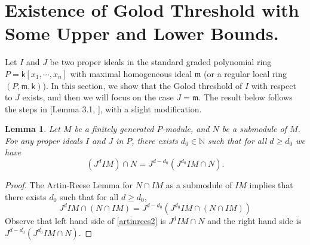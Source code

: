 \documentclass[10pt,reqno]{amsart}
\newcounter{intro}
\newtheorem{lemma}[subsection]{Lemma}
\theoremstyle{definition}
\theoremstyle{remark}
\numberwithin{equation}{section}
\newcommand{\depth}{\mathrm{depth}}
\newcommand{\kk}{\mathsf k}
\newcommand{\m}{\mathfrak m}
\numberwithin{equation}{section}
\begin{document}



\section{Existence of Golod Threshold with Some Upper and Lower Bounds.}
Let $I$ and $J$ be two proper ideals in the standard graded polynomial ring $P=\kk[x_1,\cdots,x_n]$ with maximal homogeneous ideal $\m$ (or a regular local ring $(P,\m,\kk)$). In this section, we show that the Golod threshold of $I$ with respect to $J$ exists, and then we will focus on the case $J=\m$.
 The result below follows the steps in [Lemma 3.1, \cite{maleki2019golod}], with a slight modification.
\begin{lemma}\label{artinrees1}
    Let $M$ be a finitely generated $P$-module, and $N$ be a submodule of $M$. For any proper ideals $I$ and $J$ in $P$, there exists $d_0\in \mathbb{N}$ such that for all $d\geq d_0$ we have \[
    (J^dIM)\cap N=J^{d-d_0}(J^{d_0}IM\cap N).
    \]
\end{lemma}
\begin{proof}
    The Artin-Reese Lemma for $N\cap IM$ as a submodule of $IM$ implies that there exists $d_0$ such that for all $d\geq d_0$,\begin{equation}\label{artinrees2}
    J^dIM\cap (N\cap IM)=J^{d-d_0}(J^{d_0}IM\cap (N\cap IM))
    \end{equation}
    Observe that left hand side of \cref{artinrees2} is $J^dIM\cap N$ and the right hand side is $J^{d-d_0}(J^{d_0}IM\cap N)$.
\end{proof}
\end{document}
